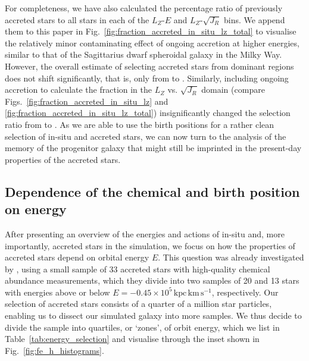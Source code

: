 \documentclass[fleqn,usenatbib]{mnras}
\begin{document}
For completeness, we have also calculated the percentage ratio of previously accreted stars to all stars in each of the $L_Z$-$E$ and $L_Z$-$\sqrt{J_R}$ bins. We append them to this paper in Fig.~\ref{fig:fraction_accreted_in_situ_lz_total} to visualise the relatively minor contaminating effect of ongoing accretion at higher energies, similar to that of the Sagittarius dwarf spheroidal galaxy in the Milky Way. However, the overall estimate of selecting accreted stars from dominant regions does not shift significantly, that is, only from  to . Similarly, including ongoing accretion to calculate the fraction in the $L_Z$ vs. $\sqrt{J_R}$ domain (compare Figs.~\ref{fig:fraction_accreted_in_situ_lz} and \ref{fig:fraction_accreted_in_situ_lz_total}) insignificantly changed the selection ratio from  to . As we are able to use the birth positions for a rather clean selection of in-situ and accreted stars, we can now turn to the analysis of the memory of the progenitor galaxy that might still be imprinted in the present-day properties of the accreted stars.

\subsection{Dependence of the chemical and birth position on energy} \label{sec:analysis_chemodynamic_memory}

After presenting an overview of the energies and actions of in-situ and, more importantly, accreted stars in the simulation, we focus on how the properties of accreted stars depend on orbital energy $E$. This question was already investigated by \citet{Skuladottir2025}, using a small sample of 33 accreted stars with high-quality chemical abundance measurements, which they divide into two samples of 20 and 13 stars with energies above or below $E = -0.45\times10^{5}\,\mathrm{kpc\,km\,s^{-1}}$, respectively. Our selection of accreted stars consists of a quarter of a million star particles, enabling us to dissect our simulated galaxy into more samples. We thus decide to divide the sample into quartiles, or `zones', of orbit energy, which we list in Table~\ref{tab:energy_selection} and visualise through the inset shown in Fig.~\ref{fig:fe_h_histograms}.
\end{document}
